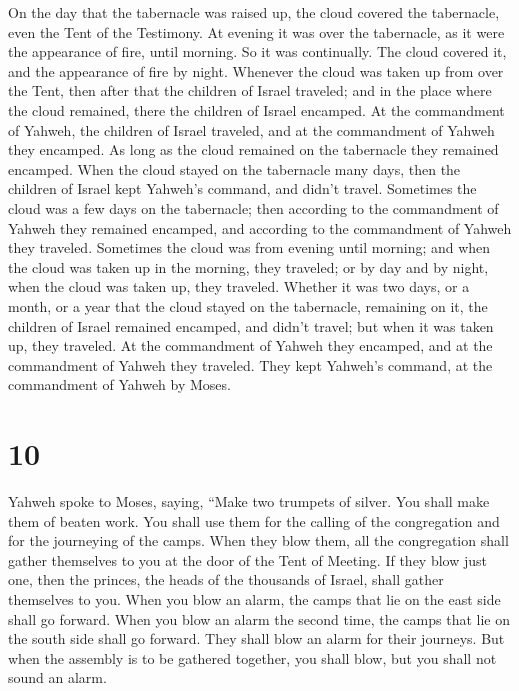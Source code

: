  On the day that the tabernacle was raised up, the cloud
covered the tabernacle, even the Tent of the Testimony. At evening it
was over the tabernacle, as it were the appearance of fire, until
morning.  So it was continually. The cloud covered it,
and the appearance of fire by night.  Whenever the cloud
was taken up from over the Tent, then after that the children of Israel
traveled; and in the place where the cloud remained, there the children
of Israel encamped.  At the commandment of Yahweh, the
children of Israel traveled, and at the commandment of Yahweh they
encamped. As long as the cloud remained on the tabernacle they remained
encamped.  When the cloud stayed on the tabernacle many
days, then the children of Israel kept Yahweh's command, and didn't
travel.  Sometimes the cloud was a few days on the
tabernacle; then according to the commandment of Yahweh they remained
encamped, and according to the commandment of Yahweh they traveled.
 Sometimes the cloud was from evening until morning; and
when the cloud was taken up in the morning, they traveled; or by day and
by night, when the cloud was taken up, they traveled. 
Whether it was two days, or a month, or a year that the cloud stayed on
the tabernacle, remaining on it, the children of Israel remained
encamped, and didn't travel; but when it was taken up, they traveled.
 At the commandment of Yahweh they encamped, and at the
commandment of Yahweh they traveled. They kept Yahweh's command, at the
commandment of Yahweh by Moses.

\hypertarget{section-9}{%
\section{10}\label{section-9}}

 Yahweh spoke to Moses, saying,  ``Make two
trumpets of silver. You shall make them of beaten work. You shall use
them for the calling of the congregation and for the journeying of the
camps.  When they blow them, all the congregation shall
gather themselves to you at the door of the Tent of Meeting.
 If they blow just one, then the princes, the heads of the
thousands of Israel, shall gather themselves to you.  When
you blow an alarm, the camps that lie on the east side shall go forward.
 When you blow an alarm the second time, the camps that
lie on the south side shall go forward. They shall blow an alarm for
their journeys.  But when the assembly is to be gathered
together, you shall blow, but you shall not sound an alarm.

